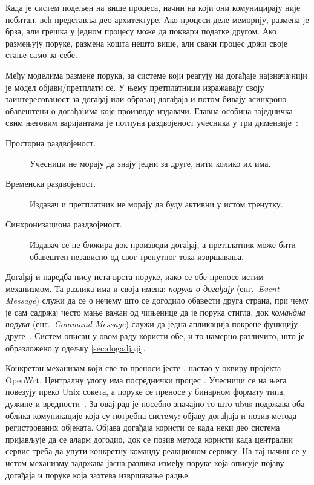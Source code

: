 \documentclass[12pt,oneside]{memoir}
\begin{document}
Када је систем подељен на више процеса, начин на који они комуницирају није небитан, већ представља део
архитектуре. Ако процеси деле меморију, размена је брза, али грешка у једном процесу може да
поквари податке другом. Ако размењују поруке, размена кошта нешто више, али сваки процес
држи своје стање само за себе.

Међу моделима размене порука, за системе који реагују на догађаје најзначајнији је модел
објави/претплати се. У њему претплатници изражавају своју заинтересованост за догађај или
образац догађаја
и потом бивају асинхроно обавештени о догађајима које производе издавачи. Главна особина
заједничка свим његовим варијантама је потпуна раздвојеност учесника у три
димензије~\cite{Eugster2003}:
\begin{description}
    \item[Просторна раздвојеност.] Учесници не морају да знају једни за друге, нити колико их има.

    \item[Временска раздвојеност.] Издавач и претплатник не морају да буду активни у истом тренутку.

    \item[Синхронизациона раздвојеност.] Издавач се не блокира док производи догађај, а претплатник може бити обавештен независно од свог тренутног тока извршавања.
\end{description}

Догађај и наредба нису иста врста поруке, иако се обе преносе истим механизмом. Та разлика
има и своја имена: \emph{порука о догађају} (енг.\ \textit{Event
Message}) служи да се о нечему што се догодило обавести друга страна, при чему је сам садржај
често мање важан од чињенице да је порука стигла, док \emph{командна порука}
(енг.\ \textit{Command Message}) служи да једна апликација покрене функцију
друге~\cite{HohpeEIP}. Систем описан у овом раду користи обе, и то намерно различито, што је
образложено у одељку \ref{sec:dogadjaji}.

Конкретан механизам који све то преноси јесте , настао у оквиру пројекта
{\lat OpenWrt}. Централну улогу има посреднички процес . Учесници се на њега
повезују преко {\lat Unix} сокета, а поруке се преносе у бинарном формату типа, дужине и
вредности~\cite{OpenWrtUbus}. За овај рад је посебно значајно то што {\lat ubus}
подржава оба облика комуникације која су потребна систему: објаву
догађаја и позив метода регистрованих објеката. Објава догађаја користи
се када неки део система пријављује да се аларм догодио, док се позив
метода користи када централни сервис треба да упути конкретну команду
реакционом сервису. На тај начин се у истом механизму задржава јасна
разлика између поруке која описује појаву догађаја и поруке која захтева
извршавање радње.
\end{document}
